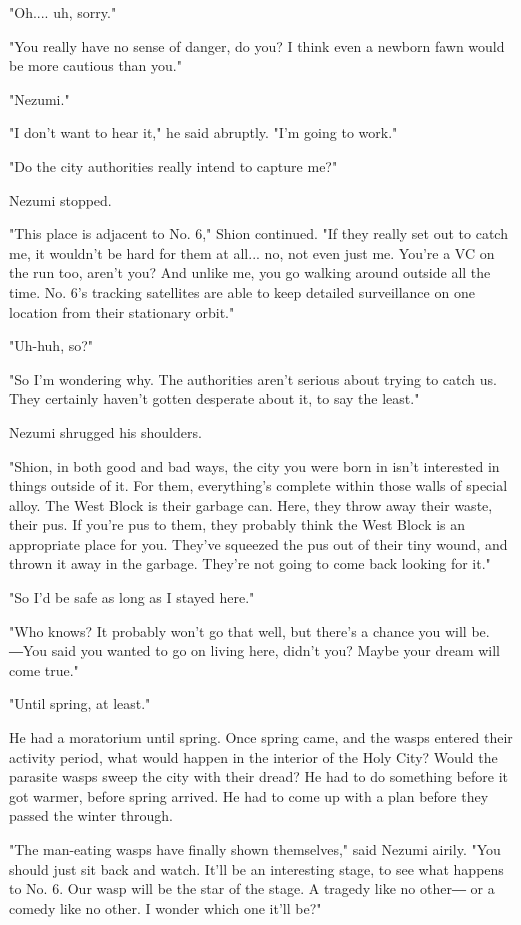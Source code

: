 "Oh.... uh, sorry."

"You really have no sense of danger, do you? I think even a newborn fawn
would be more cautious than you."

"Nezumi."

"I don't want to hear it," he said abruptly. "I'm going to work."

"Do the city authorities really intend to capture me?"

Nezumi stopped.

"This place is adjacent to No. 6," Shion continued. "If they really set
out to catch me, it wouldn't be hard for them at all... no, not even
just me. You're a VC on the run too, aren't you? And unlike me, you go
walking around outside all the time. No. 6's tracking satellites are
able to keep detailed surveillance on one location from their stationary
orbit."

"Uh-huh, so?"

"So I'm wondering why. The authorities aren't serious about trying to
catch us. They certainly haven't gotten desperate about it, to say the
least."

Nezumi shrugged his shoulders.

"Shion, in both good and bad ways, the city you were born in isn't
interested in things outside of it. For them, everything's complete
within those walls of special alloy. The West Block is their garbage
can. Here, they throw away their waste, their pus. If you're pus to
them, they probably think the West Block is an appropriate place for
you. They've squeezed the pus out of their tiny wound, and thrown it
away in the garbage. They're not going to come back looking for it."

"So I'd be safe as long as I stayed here."

"Who knows? It probably won't go that well, but there's a chance you
will be. ―You said you wanted to go on living here, didn't you? Maybe
your dream will come true."

"Until spring, at least."

He had a moratorium until spring. Once spring came, and the wasps
entered their activity period, what would happen in the interior of the
Holy City? Would the parasite wasps sweep the city with their dread? He
had to do something before it got warmer, before spring arrived. He had
to come up with a plan before they passed the winter through.

"The man-eating wasps have finally shown themselves," said Nezumi
airily. "You should just sit back and watch. It'll be an interesting
stage, to see what happens to No. 6. Our wasp will be the star of the
stage. A tragedy like no other― or a comedy like no other. I wonder
which one it'll be?"

